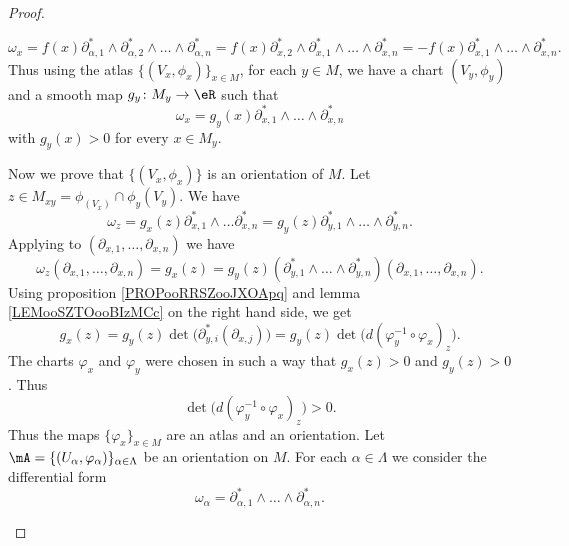 \begin{proof}
\begin{subproof}
\begin{equation}
			\omega_x=f(x)\partial^*_{\alpha,1}\wedge\partial^*_{\alpha,2}\wedge\ldots \wedge\partial^*_{\alpha,n}=f(x)\partial^*_{x,2}\wedge\partial^*_{x,1}\wedge\ldots\wedge\partial^*_{x,n}=-f(x)\partial^*_{x,1}\wedge\ldots\wedge\partial^*_{x,n}.
		\end{equation}
		Thus using the atlas \( \{ (V_x,\phi_x) \}_{x\in M}\), for each \( y\in M\), we have a chart \( (V_y,\phi_y)\) and a smooth map \(g_y \colon M_y\to \eR  \) such that
		\begin{equation}
			\omega_x=g_y(x)\partial^*_{x,1}\wedge\ldots\wedge\partial^*_{x,n}
		\end{equation}
		with \( g_y(x)>0\) for every \( x\in M_y\).

		Now we prove that \( \{ (V_x,\phi_x) \}\) is an orientation of \( M\). Let \( z\in M_{xy}=\phi_(V_x)\cap \phi_y(V_y)\). We have
		\begin{equation}
			\omega_z=g_x(z)\partial_{x,1}^*\wedge\ldots\partial^*_{x,n}=g_y(z)\partial_{y,1}^*\wedge\ldots\wedge\partial_{y,n}^*.
		\end{equation}
		Applying to \( (\partial_{x,1},\ldots,\partial_{x,n})\) we have
		\begin{equation}
			\omega_z(\partial_{x,1},\ldots,\partial_{x,n})=g_x(z)=g_y(z)(\partial_{y,1}^*\wedge\ldots\wedge\partial_{y,n}^*)(\partial_{x,1},\ldots,\partial_{x,n}).
		\end{equation}
		Using proposition \ref{PROPooRRSZooJXOApq} and lemma \ref{LEMooSZTOooBIzMCc} on the right hand side, we get
		\begin{equation}
			g_x(z)=g_y(z)\det\Big( \partial_{y,i}^*(\partial_{x,j}) \Big)=g_y(z)\det\big( d(\varphi_y^{-1}\circ\varphi_x)_z \big).
		\end{equation}
		The charts \( \varphi_x\) and \( \varphi_y\) were chosen in such a way that \( g_x(z)>0\) and \( g_y(z)>0\). Thus
		\begin{equation}
			\det\big( d(\varphi_y^{-1}\circ\varphi_x)_z \big)>0.
		\end{equation}
		Thus the maps \( \{ \varphi_x \}_{x\in M}\) are an atlas and an orientation.
		\spitem[\( \Rightarrow\)]
		Let \( \mA=\{ (U_{\alpha}, \varphi_{\alpha}) \}_{\alpha\in \Lambda}\) be an orientation on \( M\). For each \( \alpha\in \Lambda\) we consider the differential form
		\begin{equation}
			\omega_{\alpha}=\partial_{\alpha,1}^*\wedge\ldots \wedge\partial_{\alpha,n}^*.
		\end{equation}
	\end{subproof}
\end{proof}


